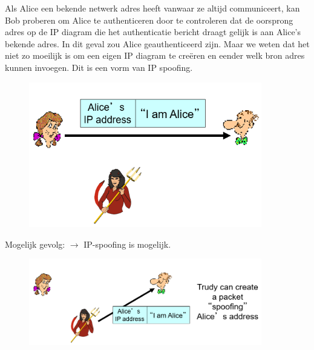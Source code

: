 Als Alice een bekende netwerk adres heeft vanwaar ze altijd communiceert, kan Bob proberen om Alice te authenticeren door te controleren dat de oorsprong adres op de IP diagram die het authenticatie bericht draagt gelijk is aan Alice’s bekende adres. In dit geval zou Alice geauthenticeerd zijn.
Maar we weten dat het niet zo moeilijk is om een eigen IP diagram te creëren en eender welk bron adres kunnen invoegen. Dit is een vorm van IP spoofing.
\begin{figure}[h]
    \centering
    \includegraphics[width=4in]{./img/imghfdst8/hfdst8puntje14.png}
    \caption{ }      
    \label{fig: }
\end{figure}

\noindent Mogelijk gevolg: $\rightarrow$ IP-spoofing is mogelijk.

\begin{figure}[h]
    \centering
    \includegraphics[width=4in]{./img/imghfdst8/hfdst8puntje15.png}
    \caption{ }      
    \label{fig: }
\end{figure}




